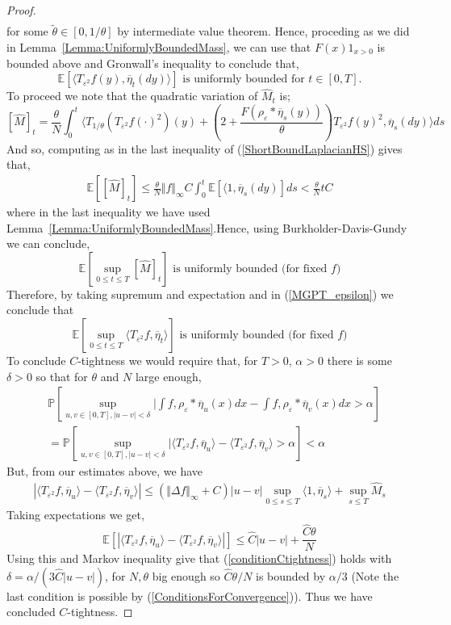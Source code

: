 \documentclass[a4paper,12pt]{article}
\newcommand{\EE}{\mathbb{E}}
\newcommand{\PP}{\mathbb{P}}
\newcommand{\1}{{\bf {1}}}
\def\epsilon{\varepsilon}
\begin{document}
\begin{proof}
\begin{align}
 \end{align}
for some $\tilde{\theta} \in [0,1/\theta]$ by intermediate value theorem. Hence, proceding as we did in Lemma~\ref{Lemma:UniformlyBoundedMass}, we can use that $F(x)1_{x > 0}$ is bounded above and Gronwall's inequality to conclude that,
\[ \EE\left[\langle T_{\epsilon^2} f(y), \overline{\eta}_t(dy) \rangle \right] \text{ is uniformly bounded for } t \in [0,T].\]
To proceed we note that the quadratic variation of $\widehat{M}_t$ is;
\[ [ \widehat{M}]_t = \frac{\theta}{N}\int_0^t \langle T_{1/\theta}(T_{\epsilon^2}f(\cdot)^2)(y) + \left(2+\frac{F(\rho_\epsilon*\overline{\eta}_s(y))}{\theta}\right)T_{\epsilon^2}f(y)^2, \overline{\eta}_s(dy) \rangle ds \]
And so, computing as in the last inequality of (\ref{ShortBoundLaplacianHS}) gives that,
\begin{align*}
\EE\left[ [\widehat{M}]_t \right] \leq \frac{\theta}{N} \Vert f \Vert_\infty C \int_0^t \mathbb{E}\left[ \langle 1, \overline{\eta}_s(dy) \right] ds < \frac{\theta}{N} t C
\end{align*}
where in the last inequality we have used Lemma~\ref{Lemma:UniformlyBoundedMass}.Hence, using Burkholder-Davis-Gundy we can conclude,
\[ \EE[\sup_{0 \leq t \leq T} [\widehat{M}]_t ] \text{ is uniformly bounded (for fixed } f \text{)} \]
Therefore, by taking supremum and expectation and in (\ref{MGPT_epsilon}) we conclude that
\[ \EE[\sup_{0 \leq t \leq T} \langle T_{\epsilon^2} f, \overline{\eta}_t \rangle ] \text{ is uniformly bounded (for fixed } f \text{)} \]
To conclude $C$-tightness we would require that, for $T>0$, $\alpha > 0$ there is some $\delta >0$ so that for $\theta$ and $N$ large enough,
\begin{align}
&\PP\left[ \sup_{u,v \in [0,T], |u-v| < \delta} | \int f, \rho_\epsilon*\overline{\eta}_u(x) dx   - \int f, \rho_\epsilon*\overline{\eta}_v(x) dx   > \alpha \right] \\ &=
\PP\left[ \sup_{u,v \in [0,T], |u-v| < \delta} | \langle T_{\epsilon^2} f, \overline{\eta}_u \rangle - \langle T_{\epsilon^2} f,\overline{\eta}_v \rangle > \alpha \right] < \alpha \label{conditionCtightness}
\end{align}
But, from our estimates above, we have
\begin{align*}
|\langle T_{\epsilon^2} f, \overline{\eta}_u \rangle - \langle T_{\epsilon^2} f,\overline{\eta}_v \rangle|  \leq ( \Vert \Delta f \Vert_\infty+C) |u-v| \sup_{0 \leq s \leq T } \langle 1, \overline{\eta}_s \rangle + \sup_{s \leq T}\widehat{M}_s
\end{align*}
Taking expectations we get,
\begin{equation}
\EE\left[ |\langle T_{\epsilon^2} f, \overline{\eta}_u \rangle - \langle T_{\epsilon^2} f,\overline{\eta}_v \rangle|\right] \leq \widehat{C} |u-v| + \frac{\widehat{C}\theta}{N}\end{equation}
Using this and Markov inequality give that (\ref{conditionCtightness}) holds with $\delta = \alpha/(3 \widehat{C}|u-v|)$, for $N,\theta$ big enough so $\widehat{C}\theta/N$ is bounded by $\alpha/3$ (Note the last condition is possible by (\ref{ConditionsForConvergence})). Thus we have concluded $C$-tightness. 
\end{proof}
\end{document}
